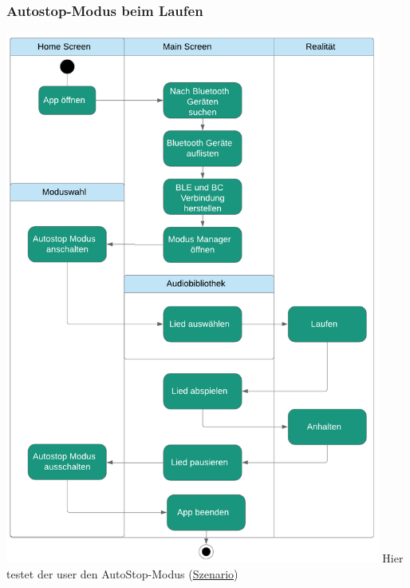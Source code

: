 \documentclass[../pflichtenheft.tex]{subfiles}
\begin{document}
		\subsubsection{Autostop-Modus beim Laufen}
		\label{sec:autostop}
			\includegraphics[page=1,width=350pt,keepaspectratio]{../graphics/UML/Autostop_Diagramm.png}
			\newline
			Hier testet der \Gls{user} den AutoStop-Modus (\hyperref[sec:autostopS]{Szenario})
\end{document}
